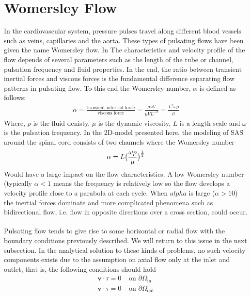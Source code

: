 \section{Womersley Flow}
In the cardiovascular system, pressure pulses travel along different blood vessels such as veins, capillaries and the aorta. These types of pulsating flows have been given the name Womersley flow. In  The characteristics and velocity profile of the flow depends of several parameters such as the length of the tube or channel, pulsation frequency and fluid properties. In the end, the ratio between transient inertial forces and viscous forces is the fundamental difference separating flow patterns in pulsating flow. To this end the Womersley number, $\alpha$ is defined as follows:
\begin{align}
\alpha = \frac{\text{transient intertial force}}{\text{viscous force}} = \frac{\rho\omega V}{\mu V L^{-2}} = \frac{L^2 \omega \rho}{\mu}
\end{align}
Where, $\rho$ is the fluid denisty, $\mu$ is the dynamic viscosity, $L$ is a length scale and $\omega$ is the pulsation frequency. In the 2D-model presented here, the modeling of SAS around the spinal cord consists of two channels where the Womersley number
\begin{align}
\alpha = L\big{(}\frac{\omega \rho}{\mu}\big{)}^{\frac{1}{2}}
\end{align}
Would have a large impact on the flow characteristics. A low Womersley number (typically $\alpha < 1$ means the frequency is relatively low so the flow develops a velocity profile close to a parabola at each cycle. When $alpha$ is large ($\alpha > 10$) the inertial forces dominate and more complicated phenomena such as bidirectional flow, i.e. flow in opposite directions over a cross section, could occur. 
\\
\\
Pulsating flow tends to give rise to some horizontal or radial flow with the boundary conditions previously described. We will return to this issue in the next subsection. In the analytical solution to these kinds of problems, no such velocity components exists due to the assumption on axial flow only at the inlet and outlet, that is, the following conditions should hold 
\begin{align}
\mathbf{v}\cdot \tau = 0 & \text{ on } \partial \Omega_{\text{in}} \\
\mathbf{v}\cdot \tau = 0 & \text{ on } \partial \Omega_{\text{out}} \label{P_out}
\end{align}
